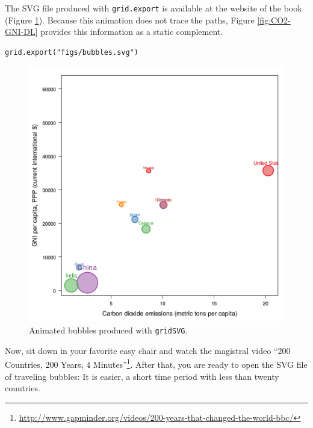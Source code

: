The SVG file produced with \texttt{grid.export} is available at the website
of the book (Figure \ref{fig:bubblesSVG}). Because this animation does
not trace the paths, Figure \ref{fig:CO2-GNI-DL} provides this
information as a static complement.


\lstset{language=r,label= ,caption= ,captionpos=b,numbers=none}
\begin{lstlisting}
grid.export("figs/bubbles.svg")
\end{lstlisting}

\begin{figure}
  \centering
  \includegraphics[width=\textwidth]{figs/bubbles.png}
  \caption{Animated bubbles produced with \texttt{gridSVG}.}
  \label{fig:bubblesSVG}
\end{figure}

Now, sit down in your favorite easy chair and watch the magistral
video ``200 Countries, 200 Years, 4 Minutes''\footnote{\url{http://www.gapminder.org/videos/200-years-that-changed-the-world-bbc/}}. After that, you are
ready to open the SVG file of traveling bubbles: It is easier, a short
time period with less than twenty countries.
